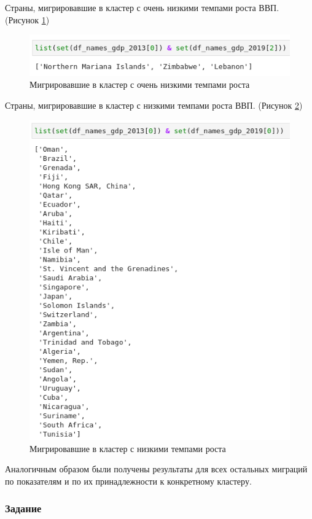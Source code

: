\documentclass[14pt,fleqn]{extarticle}
\begin{document}
	Страны, мигрировавшие в кластер с очень низкими темпами роста ВВП. (Рисунок \ref{fig:cluster_mean_very_low})

	\begin{figure}[h]
		\centering \includegraphics[scale=0.5]{cluster_mean_very_low}
		\caption{Мигрировавшие в кластер с очень низкими темпами роста}
		\label{fig:cluster_mean_very_low}
	\end{figure}

	\newpage
	
	Страны, мигрировавшие в кластер с низкими темпами роста ВВП. (Рисунок \ref{fig:cluster_mean_low})
	
	\begin{figure}[h]
		\centering \includegraphics[scale=0.45]{cluster_mean_low}
		\caption{Мигрировавшие в кластер с низкими темпами роста}
		\label{fig:cluster_mean_low}
	\end{figure}

	Аналогичным образом были получены результаты для всех остальных миграций по показателям и по их принадлежности к конкретному кластеру.
	
	\newpage
	
	\subsubsection*{Задание}
	
\end{document}
